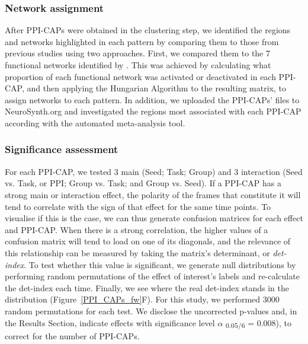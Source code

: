 \subsubsection{Network assignment}
After PPI-CAPs were obtained in the clustering step, we identified the regions and networks highlighted in each pattern by comparing them to those from previous studies using two approaches. First, we compared them to the 7 functional networks identified by \cite{Yeo2011}. This was achieved by calculating what proportion of each functional network was activated or deactivated in each PPI-CAP, and then applying the Hungarian Algorithm \cite{Munkres1957} to the resulting matrix, to assign networks to each pattern.  In addition, we uploaded the PPI-CAPs' files to NeuroSynth.org \citep{Wager2011a} and investigated the regions most associated with each PPI-CAP according with the automated meta-analysis tool. 


\subsubsection{Significance assessment}
For each PPI-CAP, we tested 3 main (Seed; Task; Group) and 3 interaction (Seed vs. Task, or PPI; Group vs. Task; and Group vs. Seed).
If a PPI-CAP has a strong main or interaction effect, the polarity of the frames that constitute it will tend to correlate with the sign of that effect for the same time points. To visualise if this is the case, we can thus generate confusion matrices for each effect and PPI-CAP. When there is a strong correlation, the higher values of a confusion matrix will tend to load on one of its diagonals, and the relevance of this relationship can be measured by taking the matrix's determinant, or \textit{det-index}. To test whether this value is significant, we generate null distributions by performing random permutations of the effect of interest's labels and re-calculate the det-index each time. Finally, we see where the real det-index stands in the distribution (Figure~\ref{PPI_CAPs_fw}F).
For this study, we performed 3000 random permutations for each test. We disclose the uncorrected p-values and, in the Results Section, indicate  effects with significance level $\alpha$ \textsubscript{$0.05/6$} = 0.008), to correct for the number of PPI-CAPs.







